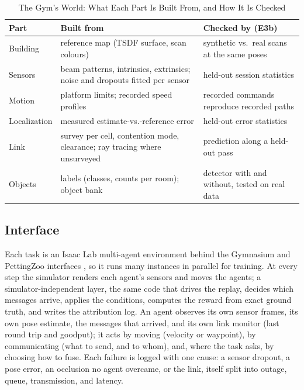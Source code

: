 \begin{table}[!t]
\centering
\caption{The Gym's World: What Each Part Is Built From, and How It Is Checked}
\label{tab:gym_world}
\footnotesize
\setlength{\tabcolsep}{3pt}
\begin{tabular}{@{}p{1.4cm} p{3.4cm} p{3.0cm}@{}}
\toprule
Part & Built from & Checked by (E3b) \\
\midrule
Building & reference map (TSDF surface, scan colours) & synthetic vs.\ real scans at the same poses \\
Sensors & beam patterns, intrinsics, extrinsics; noise and dropouts fitted per sensor & held-out session statistics \\
Motion & platform limits; recorded speed profiles & recorded commands reproduce recorded paths \\
Localization & measured estimate-vs.-reference error & held-out error statistics \\
Link & survey per cell, contention mode, clearance; ray tracing where unsurveyed & prediction along a held-out pass \\
Objects & labels (classes, counts per room); object bank & detector with and without, tested on real data \\
\bottomrule
\end{tabular}
\end{table}

\subsection{Interface}
Each task is an Isaac Lab \cite{orbit} multi-agent environment behind
the Gymnasium and PettingZoo interfaces \cite{gymnasium,pettingzoo}, so
it runs many instances in parallel for training. At every step the
simulator renders each agent's sensors and moves the agents; a
simulator-independent layer, the same code that drives the replay,
decides which messages arrive, applies the conditions, computes the
reward from exact ground truth, and writes the attribution log. An
agent observes its own sensor frames, its own pose estimate, the
messages that arrived, and its own link monitor (last round trip and
goodput); it acts by moving (velocity or waypoint), by communicating
(what to send, and to whom), and, where the task asks, by choosing how
to fuse. Each failure is logged with one cause: a sensor dropout, a
pose error, an occlusion no agent overcame, or the link, itself split
into outage, queue, transmission, and latency.


